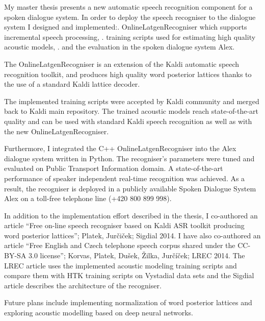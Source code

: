 My master thesis presents a new automatic speech recognition component for a spoken dialogue system.
In order to deploy the speech recogniser to the dialogue system I designed and implemented:\hfil\break\hfil{}. OnlineLatgenRecogniser which supports incremental speech processing, \hfil{}. training scripts used for estimating high quality acoustic models, \hfil{}. and the evaluation in the spoken dialogue system Alex.\hfil\break

The OnlineLatgenRecogniser is an extension of the Kaldi automatic speech recognition toolkit, and
produces high quality word posterior lattices thanks to the use of a standard Kaldi lattice decoder.

The implemented training scripts were accepted by Kaldi community and merged back to Kaldi main repository. 
The trained acoustic models reach state-of-the-art quality and can be used with standard Kaldi speech recognition as well as with the new OnlineLatgenRecogniser. 

Furthermore, I integrated the C++ OnlineLatgenRecogniser into the Alex dialogue system written in Python. 
The recogniser's parameters were tuned and evaluated on Public Transport Information domain. 
A state-of-the-art performance of speaker independent real-time recognition was achieved. 
As a result, the recogniser is deployed in a publicly available Spoken Dialogue System Alex on a toll-free telephone line (+420 800 899 998).

In addition to the implementation effort described in the thesis, I co-authored an article ``Free on-line speech recogniser based on Kaldi ASR toolkit producing word posterior lattices''; Platek, Jur\v{c}i\v{c}ek; Sigdial 2014. I have also co-authored an article ``Free English and Czech telephone speech corpus shared under the CC-BY-SA 3.0 license''; Korvas, Platek, Du\v{s}ek, \v{Z}ilka, Jur\v{c}\'{i}\v{c}ek; LREC 2014. The LREC article uses the implemented acoustic modeling training scripts and compare them with HTK training scripts on Vystadial data sets and the Sigdial article describes the architecture of the recogniser. 

Future plans include implementing normalization of word posterior lattices and exploring acoustic modelling based on deep neural networks.

